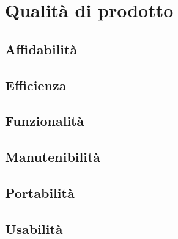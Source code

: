 \chapter{Qualità di prodotto}\label{qualita-di-prodotto}

\section{Affidabilità}

\section{Efficienza}

\section{Funzionalità}

\section{Manutenibilità}

\section{Portabilità}

\section{Usabilità}